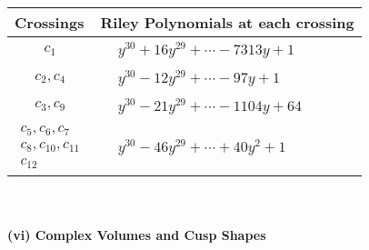 \documentclass[1p]{elsarticle_modified}
\theoremstyle{definition}
\begin{document}
\begin{tabular}{m{50pt}|m{274pt}}
Crossings & \hspace{64pt}Riley Polynomials at each crossing \\
\hline $$\begin{aligned}c_{1}\end{aligned}$$&$\begin{aligned}
&y^{30}+16 y^{29}+\cdots-7313 y+1
\end{aligned}$\\
\hline $$\begin{aligned}c_{2},c_{4}\end{aligned}$$&$\begin{aligned}
&y^{30}-12 y^{29}+\cdots-97 y+1
\end{aligned}$\\
\hline $$\begin{aligned}c_{3},c_{9}\end{aligned}$$&$\begin{aligned}
&y^{30}-21 y^{29}+\cdots-1104 y+64
\end{aligned}$\\
\hline $$\begin{aligned}c_{5},c_{6},c_{7}\\c_{8},c_{10},c_{11}\\c_{12}\end{aligned}$$&$\begin{aligned}
&y^{30}-46 y^{29}+\cdots+40 y^2+1
\end{aligned}$\\
\hline
\end{tabular}\\~\\
\newpage\flushleft \textbf{(vi) Complex Volumes and Cusp Shapes}
\end{document}
